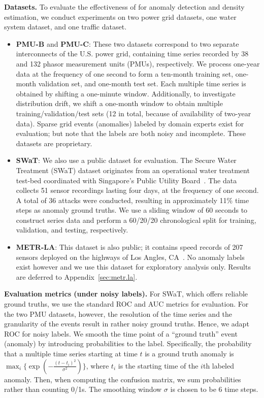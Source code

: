 \textbf{Datasets.}
To evaluate the effectiveness of {\method} for anomaly detection and density estimation, we conduct experiments on two power grid datasets, one water system dataset, and one traffic dataset.
\begin{itemize} [leftmargin=*]
\item \textbf{PMU-B} and \textbf{PMU-C}: These two datasets correspond to two separate interconnects of the U.S. power grid, containing time series recorded by 38 and 132 phasor measurement units (PMUs), respectively. We process one-year data at the frequency of one second to form a ten-month training set, one-month validation set, and one-month test set. Each multiple time series is obtained by shifting a one-minute window. Additionally, to investigate distribution drift, we shift a one-month window to obtain multiple training/validation/test sets (12 in total, because of availability of two-year data). Sparse grid events (anomalies) labeled by domain experts exist for evaluation; but note that the labels are both noisy and incomplete. These datasets are proprietary.

\item \textbf{SWaT}: We also use a public dataset for evaluation. The Secure Water Treatment (SWaT) dataset originates from an operational water treatment test-bed coordinated with Singapore's Public Utility Board~\citep{goh2016dataset}. The data collects 51 sensor recordings lasting four days, at the frequency of one second. A total of 36 attacks were conducted, resulting in approximately 11\% time steps as anomaly ground truths. We use a sliding window of 60 seconds to construct series data and perform a 60/20/20 chronological split for training, validation, and testing, respectively.

\item \textbf{METR-LA}: This dataset is also public; it contains speed records of 207 sensors deployed on the highways of Los Angles, CA~\citep{Li2018}. No anomaly labels exist however and we use this dataset for exploratory analysis only. Results are deferred to Appendix~\ref{sec:metr.la}.
\end{itemize}

\textbf{Evaluation metrics (under noisy labels).} For SWaT, which offers reliable ground truths, we use the standard ROC and AUC metrics for evaluation. For the two PMU datasets, however, the resolution of the time series and the granularity of the events result in rather noisy ground truths. Hence, we adapt ROC for noisy labels. We smooth the time point of a ``ground truth'' event (anomaly) by introducing probabilities to the label. Specifically, the probability that a multiple time series starting at time $t$ is a ground truth anomaly is $\max_i\{\exp(-\frac{(t-t_i)^2}{\sigma^2})\}$, where $t_i$ is the starting time of the $i$th labeled anomaly. Then, when computing the confusion matrix, we sum probabilities rather than counting 0/1s. The smoothing window $\sigma$ is chosen to be 6 time steps.

